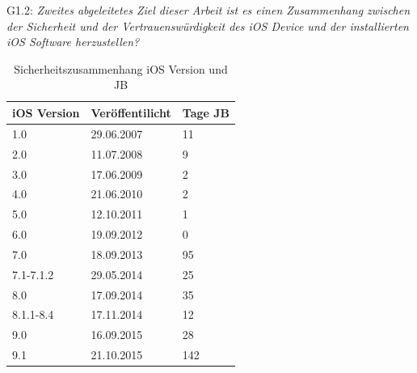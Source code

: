 G1.2: \textit{\glqq Zweites abgeleitetes Ziel dieser Arbeit ist es einen Zusammenhang zwischen der Sicherheit und der Vertrauenswürdigkeit des iOS Device und der installierten iOS Software herzustellen?\grqq{}}
\begin{table}[htp!]
    \begin{center}
        \begin{tabular}{|l|l|l|} \hline
         \textbf{iOS Version} & \textbf{Veröffentilicht} & \textbf{Tage JB}\\ \hline    
        1.0 & 29.06.2007 & 11\\ \hline 
        2.0 & 11.07.2008	& 9\\ \hline 
        3.0 & 17.06.2009	& 2\\ \hline 
        4.0 & 21.06.2010 & 2\\ \hline 
        5.0 & 12.10.2011	& 1\\ \hline 
        6.0 & 19.09.2012	& 0\\ \hline 
        7.0 & 18.09.2013	& 95\\ \hline 
        7.1-7.1.2 & 29.05.2014 & 25\\ \hline 
        8.0 & 17.09.2014	& 35\\ \hline 
        8.1.1-8.4 & 17.11.2014	& 12\\ \hline 
        9.0 & 16.09.2015	& 28\\ \hline
        9.1 & 21.10.2015	& 142\\ \hline 
        \end{tabular} 
        \caption{Sicherheitszusammenhang iOS Version und JB}
        \label{tab:iOSVersion}
    \end{center}
\end{table}
         
